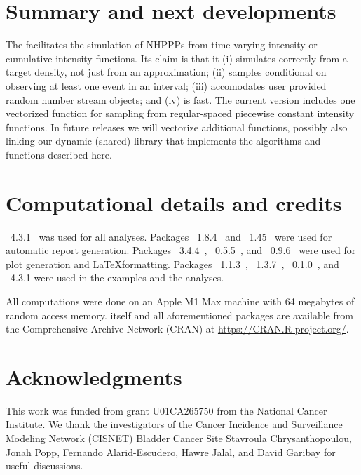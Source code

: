 \documentclass[article,nojss]{jss}\usepackage[]{graphicx}\usepackage[]{xcolor}
\begin{document}

\section{Summary and next developments} \label{sec:summary}

The  facilitates the simulation of NHPPPs from time-varying intensity or cumulative intensity functions. Its claim is that it (i) simulates correctly from a target density, not just from an approximation; (ii) samples conditional on observing at least one event in an interval; (iii) accomodates user provided random number stream objects; and (iv) is fast. The current version includes one vectorized function for sampling from regular-spaced piecewise constant intensity functions. In future releases we will vectorize additional functions, possibly also linking our  dynamic (shared) library that implements the algorithms and functions described here.



\section*{Computational details and credits}

~4.3.1~\citep{R-program}
was used for all analyses.
Packages
~{1.8.4}~\citep{xtable-package} and
~{1.45}~\citep{knitr-package}
were used for automatic report generation. Packages
~{3.4.4}~\citep{ggplot2-package},
~{0.5.5}~\citep{ggridges-package}, and
~{0.9.6}~\citep{latex2exp-package}
were used for plot generation and \LaTeX formatting.
Packages
~{1.1.3}~\citep{bench-package},
~{1.3.7}~\citep{rstream-package},
~{0.1.0}~\citep{otinference-package}, and
~{4.3.1}
were used in the examples and the analyses.

All computations were done on an Apple M1 Max machine with 64 megabytes of random access memory.
%
 itself
and all aforementioned packages are available from the Comprehensive
 Archive Network (CRAN) at
\url{https://CRAN.R-project.org/}.


\section*{Acknowledgments}
This work was funded from grant U01CA265750 from the National Cancer Institute.
We thank the investigators of the Cancer Incidence and Surveillance Modeling Network (CISNET)
Bladder Cancer Site Stavroula Chrysanthopoulou, Jonah Popp, Fernando Alarid-Escudero,
Hawre Jalal, and David Garibay for useful discussions.
\end{document}

